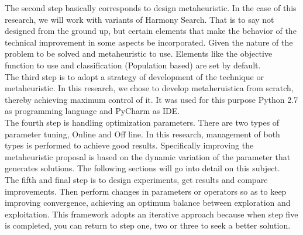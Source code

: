 The second step basically corresponds to design metaheuristic. In the case of this research, we will work with variants of Harmony Search. That is to say not designed from the ground up, but certain elements that make the behavior of the technical improvement in some aspects be incorporated. Given the nature of the problem to be solved and metaheuristic to use. Elements like the objective function to use and classification (Population based) are set by default.\\

The third step is to adopt a strategy of development of the technique or metaheuristic. In this research, we chose to develop metaheruistica from scratch, thereby achieving maximum control of it. It was used for this purpose Python 2.7 as programming language and  PyCharm as IDE.\\

The fourth step is handling optimization parameters. There are two types of parameter tuning, Online and Off line. In this research, management of both types is performed to achieve good results. Specifically improving the metaheuristic proposal is based on the dynamic variation of the parameter that generates solutions. The following sections will go into detail on this subject.\\

The fifth and final step is to design experiments, get results and compare improvements. Then perform changes in parameters or operators so as to keep improving convergence, achieving an optimum balance between exploration and exploitation. This framework adopts an iterative approach because when step five is completed, you can return to step one, two or three to seek a better solution.







